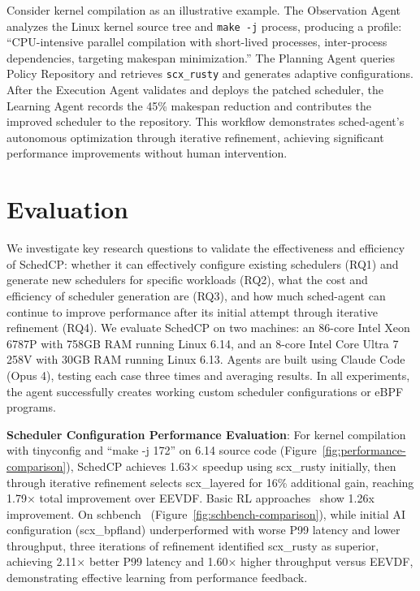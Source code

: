 \documentclass[preprint]{article}
\newcommand{\sys}{SchedCP\xspace}
\newcommand{\agent}{sched-agent\xspace}
\begin{document}
Consider kernel compilation as an illustrative example. The Observation Agent analyzes the Linux kernel source tree and \texttt{make -j} process, producing a profile: ``CPU-intensive parallel compilation with short-lived processes, inter-process dependencies, targeting makespan minimization.'' The Planning Agent queries Policy Repository and retrieves \texttt{scx\_rusty} and generates adaptive configurations. After the Execution Agent validates and deploys the patched scheduler, the Learning Agent records the 45\% makespan reduction and contributes the improved scheduler to the repository. This workflow demonstrates \agent's autonomous optimization through iterative refinement, achieving significant performance improvements without human intervention.

\section{Evaluation}
\label{sec:evaluation}


We investigate key research questions to validate the effectiveness and efficiency of \sys: whether it can effectively configure existing schedulers (RQ1) and generate new schedulers for specific workloads (RQ2), what the cost and efficiency of scheduler generation are (RQ3), and how much \agent can continue to improve performance after its initial attempt through iterative refinement (RQ4). We evaluate \sys on two machines: an 86-core Intel Xeon 6787P with 758GB RAM running Linux 6.14, and an 8-core Intel Core Ultra 7 258V with 30GB RAM running Linux 6.13. Agents are built using Claude Code (Opus 4), testing each case three times and averaging results. In all experiments, the agent successfully creates working custom scheduler configurations or eBPF programs.

\textbf{Scheduler Configuration Performance Evaluation}: For kernel compilation with tinyconfig and ``make -j 172'' on 6.14 source code (Figure~\ref{fig:performance-comparison}), \sys achieves 1.63× speedup using scx\_rusty initially, then through iterative refinement selects scx\_layered for 16\% additional gain, reaching 1.79× total improvement over EEVDF. Basic RL approaches~\cite{corbet2025ml} show 1.26x improvement. On schbench~\cite{schbench2016} (Figure~\ref{fig:schbench-comparison}), while initial AI configuration (scx\_bpfland) underperformed with worse P99 latency and lower throughput, three iterations of refinement identified scx\_rusty as superior, achieving 2.11× better P99 latency and 1.60× higher throughput versus EEVDF, demonstrating effective learning from performance feedback.
\end{document}
